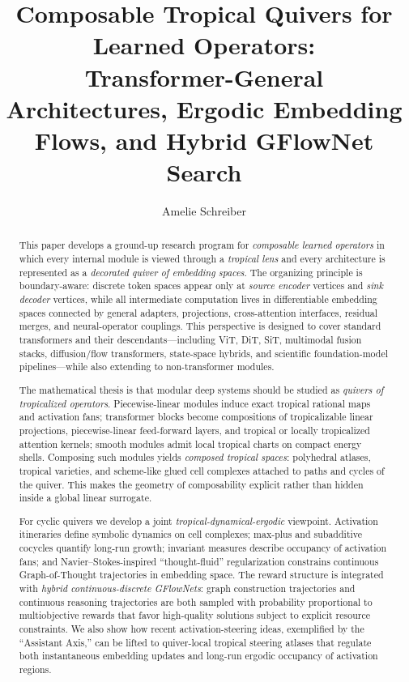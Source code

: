 \documentclass[11pt]{article}
\title{Composable Tropical Quivers for Learned Operators:\\
Transformer-General Architectures, Ergodic Embedding Flows, and Hybrid GFlowNet Search}
\author{Amelie Schreiber}
\date{\vspace{-1em}}
\theoremstyle{definition}
\theoremstyle{plain}
\theoremstyle{remark}
\begin{document}
\setcounter{tocdepth}{1}

\maketitle

\begin{abstract}
This paper develops a ground-up research program for \emph{composable learned operators} in which every internal module is viewed through a \emph{tropical lens} and every architecture is represented as a \emph{decorated quiver of embedding spaces}.
The organizing principle is boundary-aware:
discrete token spaces appear only at \emph{source encoder} vertices and \emph{sink decoder} vertices, while all intermediate computation lives in differentiable embedding spaces connected by general adapters, projections, cross-attention interfaces, residual merges, and neural-operator couplings.
This perspective is designed to cover standard transformers and their descendants---including ViT, DiT, SiT, multimodal fusion stacks, diffusion/flow transformers, state-space hybrids, and scientific foundation-model pipelines---while also extending to non-transformer modules.

The mathematical thesis is that modular deep systems should be studied as \emph{quivers of tropicalized operators}.
Piecewise-linear modules induce exact tropical rational maps and activation fans; transformer blocks become compositions of tropicalizable linear projections, piecewise-linear feed-forward layers, and tropical or locally tropicalized attention kernels; smooth modules admit local tropical charts on compact energy shells.
Composing such modules yields \emph{composed tropical spaces}: polyhedral atlases, tropical varieties, and scheme-like glued cell complexes attached to paths and cycles of the quiver.
This makes the geometry of composability explicit rather than hidden inside a global linear surrogate.

For cyclic quivers we develop a joint \emph{tropical-dynamical-ergodic} viewpoint.
Activation itineraries define symbolic dynamics on cell complexes; max-plus and subadditive cocycles quantify long-run growth; invariant measures describe occupancy of activation fans; and Navier--Stokes-inspired ``thought-fluid'' regularization constrains continuous Graph-of-Thought trajectories in embedding space.
The reward structure is integrated with \emph{hybrid continuous-discrete GFlowNets}: graph construction trajectories and continuous reasoning trajectories are both sampled with probability proportional to multiobjective rewards that favor high-quality solutions subject to explicit resource constraints.
We also show how recent activation-steering ideas, exemplified by the ``Assistant Axis,'' can be lifted to quiver-local tropical steering atlases that regulate both instantaneous embedding updates and long-run ergodic occupancy of activation regions.


\end{abstract}
\end{document}
